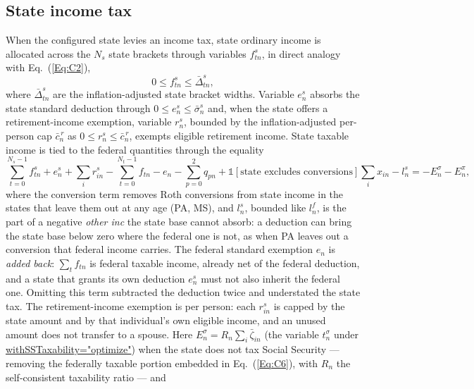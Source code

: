 \documentclass[fleqn,12pt]{report}
\newcommand{\code}[1]{\url{#1}}
\begin{document}
\subsection{State income tax}
\label{Sec:StateTax}
	When the configured state levies an income tax, state ordinary income is
	allocated across the $N_s$ state brackets through variables $f^{s}_{tn}$,
	in direct analogy with Eq.~(\ref{Eq:C2}),
	\begin{equation}
		0 \le f^{s}_{tn} \le \bar{\Delta}^{s}_{tn},
	\end{equation}
	where $\bar{\Delta}^{s}_{tn}$ are the inflation-adjusted state bracket widths.
	Variable $e^{s}_n$ absorbs the state standard deduction through
	$0 \le e^{s}_n \le \bar{\sigma}^{s}_n$ and, when the state offers a
	retirement-income exemption, variable $r^{s}_n$, bounded by the
	inflation-adjusted per-person cap $\bar{c}^{\,r}_n$ as
	$0 \le r^{s}_n \le \bar{c}^{\,r}_n$, exempts eligible retirement income.
	State taxable income is tied to the federal quantities through the equality
	\begin{equation}
		\label{Eq:StateTI}
		\sum_{t=0}^{N_s-1} f^{s}_{tn} + e^{s}_n + \sum_i r^{s}_{in}
		- \sum_{t=0}^{N_t-1} f_{tn} - e_n - \sum_{p=0}^{2} q_{pn}
		+ \mathbb{1}[\text{state excludes conversions}] \sum_i x_{in} - l^{s}_n
		= -E^{\sigma}_n - E^{\pi}_n,
	\end{equation}
	where the conversion term removes Roth conversions from state income in the states
	that leave them out at any age (PA, MS), and $l^{s}_n$, bounded like $l^{f}_n$, is the
	part of a negative \textit{other inc} the state base cannot absorb: a deduction can bring
	the state base below zero where the federal one is not, as when PA leaves out a
	conversion that federal income carries.
	The federal standard exemption $e_n$ is \emph{added back}: $\sum_t f_{tn}$ is federal
	taxable income, already net of the federal deduction, and a state that grants its own
	deduction $e^{s}_n$ must not also inherit the federal one.  Omitting this term subtracted
	the deduction twice and understated the state tax.
	The retirement-income exemption is per person: each $r^{s}_{in}$ is capped by the state
	amount and by that individual's own eligible income, and an unused amount does not
	transfer to a spouse.
	Here $E^{\sigma}_n = R_n\sum_i \bar\zeta_{in}$ (the variable $t^{\sigma}_n$ under
	\code{withSSTaxability="optimize"}) when the state does not tax
	Social Security --- removing the federally taxable portion embedded in
	Eq.~(\ref{Eq:C6}), with $R_n$ the self-consistent taxability ratio --- and
\end{document}
